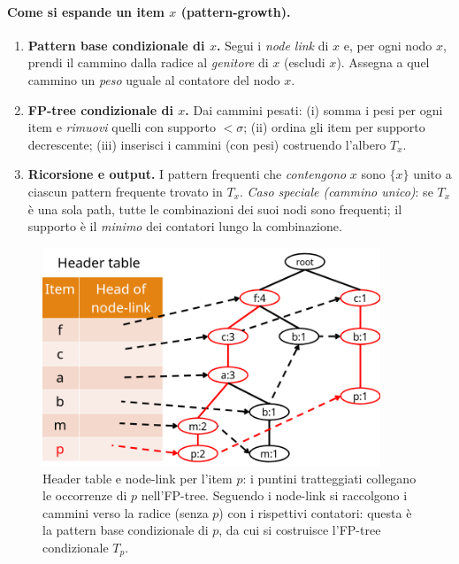 \paragraph{Come si espande un item $x$ (pattern-growth).}
\begin{enumerate}
  \item \textbf{Pattern base condizionale di $x$.} Segui i \emph{node link} di $x$ e,
        per ogni nodo $x$, prendi il cammino dalla radice al \emph{genitore} di $x$
        (escludi $x$). Assegna a quel cammino un \emph{peso} uguale al contatore del nodo $x$.
  \item \textbf{FP-tree condizionale di $x$.} Dai cammini pesati:
        (i) somma i pesi per ogni item e \emph{rimuovi} quelli con supporto $<\sigma$;
        (ii) ordina gli item per supporto decrescente; 
        (iii) inserisci i cammini (con pesi) costruendo l’albero $T_x$.
  \item \textbf{Ricorsione e output.} I pattern frequenti che \emph{contengono} $x$
        sono $\{x\}$ unito a ciascun pattern frequente trovato in $T_x$.
        \emph{Caso speciale (cammino unico)}: se $T_x$ è una sola path,
        tutte le combinazioni dei suoi nodi sono frequenti; il supporto è il \emph{minimo} dei contatori lungo la combinazione.
\end{enumerate}

\begin{figure}[htbp]
  \centering
  \includegraphics[width=0.9\textwidth]{images/fp-growth-links.png}
  \caption{Header table e node-link per l’item $p$: i puntini tratteggiati collegano le occorrenze di $p$ nell’FP-tree. Seguendo i node-link si raccolgono i cammini verso la radice (senza $p$) con i rispettivi contatori: questa è la pattern base condizionale di $p$, da cui si costruisce l’FP-tree condizionale $T_p$.}
  \label{fig:fp-growth-links}
\end{figure}


